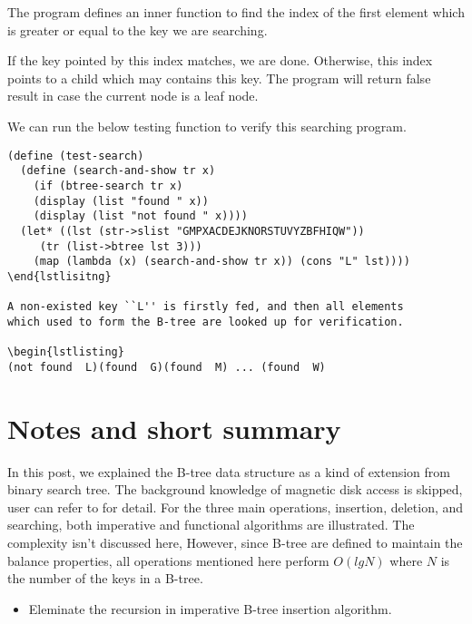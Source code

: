 \documentclass{article}
\begin{document}
The program defines an inner function to find the index of the
first element which is greater or equal to the key we are searching.

If the key pointed by this index matches, we are done. Otherwise,
this index points to a child which may contains this key. The program
will return false result in case the current node is a leaf node.

We can run the below testing function to verify this searching
program.

\begin{lstlisting}
(define (test-search)
  (define (search-and-show tr x)
    (if (btree-search tr x)
	(display (list "found " x))
	(display (list "not found " x))))
  (let* ((lst (str->slist "GMPXACDEJKNORSTUVYZBFHIQW"))
	 (tr (list->btree lst 3)))
    (map (lambda (x) (search-and-show tr x)) (cons "L" lst))))
\end{lstlisitng}

A non-existed key ``L'' is firstly fed, and then all elements
which used to form the B-tree are looked up for verification.

\begin{lstlisting}
(not found  L)(found  G)(found  M) ... (found  W)
\end{lstlisting}

\section{Notes and short summary}
In this post, we explained the B-tree data structure as a kind of
extension from binary search tree. The background knowledge of
magnetic disk access is skipped, user can refer to \cite{CLRS}
for detail. For the three main operations, insertion, deletion,
and searching, both imperative and functional algorithms are
illustrated. The complexity isn't discussed here, However, since
B-tree are defined to maintain the balance properties, all operations
mentioned here perform $O(lgN)$ where $N$ is the number of the
keys in a B-tree.

\begin{Exercise}
\begin{itemize}
\item Eleminate the recursion in imperative B-tree insertion algorithm.
\end{itemize}
\end{Exercise}
\end{document}
